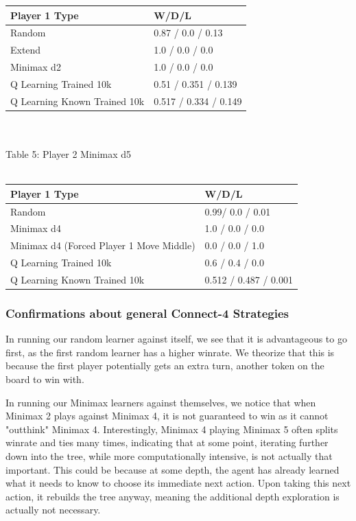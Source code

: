 \documentclass[12pt]{article}
\begin{document}
\begin{tabular}{l|l}
Player 1 Type                & W/D/L                           \\\hline
Random                       &  0.87  / 0.0 / 0.13             \\
Extend                       & 1.0  / 0.0 / 0.0                \\
Minimax d2                   & 1.0   / 0.0 /  0.0              \\
Q Learning Trained 10k         &  0.51  / 0.351 / 0.139        \\
Q Learning Known Trained 10k & 0.517 / 0.334 / 0.149 
\end{tabular}\\\\
Table 5: Player 2 Minimax d5\\\\
\begin{tabular}{l|l}
Player 1 Type                     & W/D/L               \\\hline
Random                            &  0.99/ 0.0 / 0.01     \\
Minimax d4                        & 1.0 / 0.0 / 0.0       \\
Minimax d4 (Forced Player 1 Move Middle)   & 0.0  / 0.0 / 1.0    \\
Q Learning Trained 10k            & 0.6 / 0.4 / 0.0       \\
Q Learning Known Trained 10k      & 0.512 / 0.487 / 0.001
\end{tabular}

\subsubsection{Confirmations about general Connect-4 Strategies}

In running our random learner against itself, we see that it is advantageous to go first, as the first random learner has a higher winrate. We theorize that this is because the first player potentially gets an extra turn, another token on the board to win with.

In running our Minimax learners against themselves, we notice that when Minimax 2 plays against Minimax 4, it is not guaranteed to win as it cannot "outthink" Minimax 4. Interestingly, Minimax 4 playing Minimax 5 often splits winrate and ties many times, indicating that at some point, iterating further down into the tree, while more computationally intensive, is not actually that important. This could be because at some depth, the agent has already learned what it needs to know to choose its immediate next action. Upon taking this next action, it rebuilds the tree anyway, meaning the additional depth exploration is actually not necessary.
\end{document}
